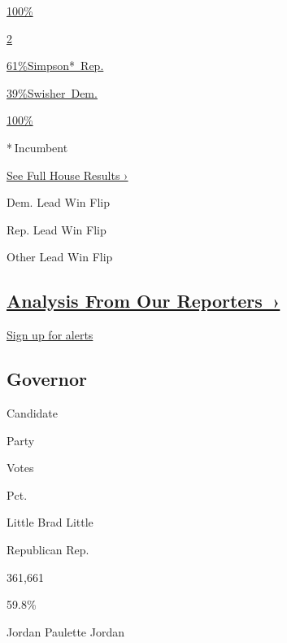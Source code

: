 \href{https://www.nytimes3xbfgragh.onion/elections/results/idaho-house-district-1}{100\%}

\href{https://www.nytimes3xbfgragh.onion/elections/results/idaho-house-district-1}{}

\href{https://www.nytimes3xbfgragh.onion/elections/results/idaho-house-district-2}{2}

\href{https://www.nytimes3xbfgragh.onion/elections/results/idaho-house-district-2}{
61\%Simpson*~Rep.}

\href{https://www.nytimes3xbfgragh.onion/elections/results/idaho-house-district-2}{
39\%Swisher~Dem.}

\href{https://www.nytimes3xbfgragh.onion/elections/results/idaho-house-district-2}{100\%}

\href{https://www.nytimes3xbfgragh.onion/elections/results/idaho-house-district-2}{}

* Incumbent~

\href{https://www.nytimes3xbfgragh.onion/interactive/2018/11/06/us/elections/results-house-elections.html}{See
Full House Results ›}

Dem. Lead Win Flip

Rep. Lead Win Flip

Other Lead Win Flip

\hypertarget{analysis-from-our-reporters-}{%
\subsection{\texorpdfstring{\href{https://www.nytimes3xbfgragh.onion/interactive/2018/11/06/us/elections/live-midterm-election-analysis-updates.html}{Analysis
From Our
Reporters~›}}{Analysis From Our Reporters~›}}\label{analysis-from-our-reporters-}}

\protect\hyperlink{}{Sign up for alerts}

\hypertarget{governor}{%
\subsection{Governor}\label{governor}}

Candidate

Party

Votes

Pct.

 Little Brad Little

Republican Rep.

361,661

59.8\%

 Jordan Paulette Jordan

